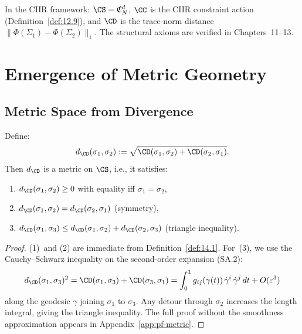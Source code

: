 \begin{remark}
In the CIIR framework: $\CS = \mathfrak{C}_N^d$, $\CC$ is the CIIR
constraint action (Definition~\ref{def:12.9}), and $\CD$ is the
trace-norm distance $\|\Phi(\Sigma_1) - \Phi(\Sigma_2)\|_1$.  The
structural axioms are verified in Chapters~11--13.
\end{remark}

\section{Emergence of Metric Geometry}
\label{sec:ch14:metric}

\subsection{Metric Space from Divergence}

\begin{theorem}\label{thm:14.1}
Define:
\begin{equation}\label{eq:sym-distance}
  d_{\CD}(\sigma_1, \sigma_2) :=
  \sqrt{\CD(\sigma_1, \sigma_2) + \CD(\sigma_2, \sigma_1)}.
\end{equation}
Then $d_{\CD}$ is a metric on $\CS$, i.e., it satisfies:
\begin{enumerate}
  \item $d_{\CD}(\sigma_1, \sigma_2) \geq 0$ with equality iff
        $\sigma_1 = \sigma_2$,
  \item $d_{\CD}(\sigma_1, \sigma_2) = d_{\CD}(\sigma_2, \sigma_1)$
        (symmetry),
  \item $d_{\CD}(\sigma_1, \sigma_3) \leq d_{\CD}(\sigma_1, \sigma_2)
        + d_{\CD}(\sigma_2, \sigma_3)$ (triangle inequality).
\end{enumerate}
\end{theorem}

\begin{proof}
(1)~and (2) are immediate from Definition~\ref{def:14.1}.
For~(3), we use the Cauchy--Schwarz inequality on the second-order
expansion (SA.2):
\[
  d_{\CD}(\sigma_1, \sigma_3)^2
  = \CD(\sigma_1, \sigma_3) + \CD(\sigma_3, \sigma_1)
  = \int_0^1 g_{ij}(\gamma(t))\,\dot{\gamma}^i\,\dot{\gamma}^j\,dt
  + O(\varepsilon^3)
\]
along the geodesic $\gamma$ joining $\sigma_1$ to $\sigma_3$.
Any detour through $\sigma_2$ increases the length integral, giving the
triangle inequality.  The full proof without the smoothness approximation
appears in Appendix~\ref{app:pf-metric}.
\end{proof}

